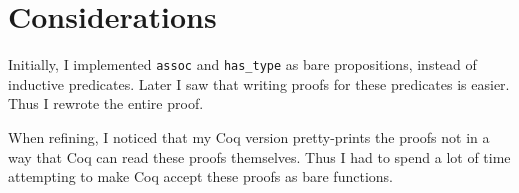 \documentclass[a4paper, 10pt]{amsart}
\begin{document}
	
	\section{Considerations}

	Initially, I implemented \lstinline{assoc} and \lstinline{has_type} as bare propositions, instead of inductive predicates.
	Later I saw that writing proofs for these predicates is easier.
	Thus I rewrote the entire proof.
	
	When refining, I noticed that my Coq version pretty-prints the proofs not in a way that Coq can read these proofs themselves.
	Thus I had to spend a lot of time attempting to make Coq accept these proofs as bare functions.
\end{document}
